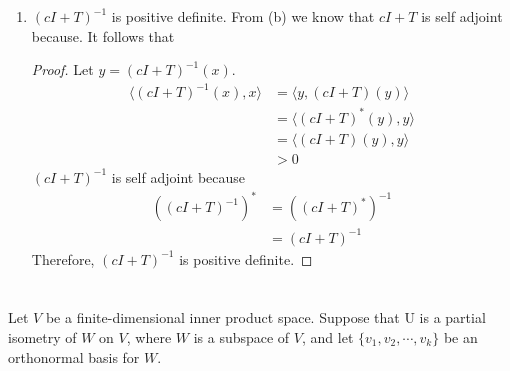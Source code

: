 \documentclass[11pt]{scrartcl}
\begin{document}
\begin{enumerate}[label=\alph*.]
{\begin{proof}
\begin{align*}
			                 & = cI + T
		      \end{align*}
		      Therefore, $cI + T$ is positive definite.
	      \end{proof}
	      }
	\item{
	      $(cI + T)^{-1}$ is positive definite. From (b) we know that $cI + T$ is self adjoint because. It follows that
	      \begin{proof}
		      Let $ y = (cI + T)^{-1}(x)$.
		      \begin{align*}
			      \langle (cI + T)^{-1}(x),x \rangle & = \langle y,(cI + T)(y) \rangle      \\
			                                         & = \langle (cI + T)^* (y), y  \rangle \\
			                                         & = \langle (cI + T)(y), y  \rangle    \\
			                                         & > 0
		      \end{align*}
		      $(cI + T)^{-1}$ is self adjoint because
		      \begin{align*}
			      ((cI + T)^{-1})^* & = ((cI + T)^{*})^{-1} \\
			                        & = (cI + T)^{-1}
		      \end{align*}
		      Therefore, $(cI + T)^{-1}$ is positive definite.
	      \end{proof}
	      }
\end{enumerate}

\section{}
Let $V$ be a finite-dimensional inner product space. Suppose that U is a partial isometry of $W$
on $V$, where $W$ is a subspace of $V$, and let $\{v_1, v_2, \cdots , v_k\}$ be an orthonormal basis for $W$.
\end{document}

